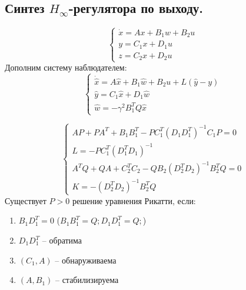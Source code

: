 \subsection{Синтез \(H_\infty\)-регулятора по выходу.}
\[
        \begin{cases}
                \dot{x} = A x + B_1 w + B_2 u \\
                y = C_1x + D_1 u  \\
                z = C_2x + D_2 u  
        \end{cases}
\]
Дополним систему наблюдателем:
\begin{equation}
    \begin{cases}
        \dot{\hat{x}} = A\hat{x} + B_1 \hat{w} + B_2u + L(\hat{y} - y)\\
        \hat{y} = C_1\hat{x} + D_1 \hat{w} \\
        \hat{w} = -\gamma^2 B_1^T Q \hat{x}
    \end{cases}
\end{equation}

\begin{equation}
    \begin{cases}
        AP + PA^T + B_1B_1^T - PC_1^T(D_1D_1^T)^{-1}C_1P = 0 \\
        L = - PC_1^T(D_1^TD_1)^{-1} \\
        A^TQ + QA + C_2^TC_2 - QB_2(D_2^TD_2)^{-1}B_2^TQ = 0 \\
        K = -(D_2^TD_2)^{-1}B_2^TQ
    \end{cases}
\end{equation}
Существует \(P > 0\) решение уравнения Рикатти, если:
\begin{enumerate}
  \item \(B_1D_1^T = 0\) (\(B_1B_1^T = Q; D_1D_1^T = Q;\))
  \item \(D_1D_1^T\) -- обратима
  \item \((C_1, A)\) -- обнаруживаема
  \item \((A, B_1)\) -- стабилизируема
\end{enumerate}

